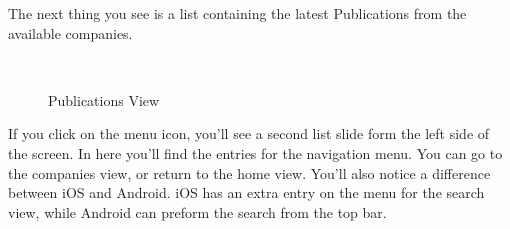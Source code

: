 The next thing you see is a list containing the latest Publications from the available companies.

\begin{figure}[H]
        \myfloatalign
         \quad
         \\
        \caption[Publications View]{Publications View}
\end{figure}

If you click on the menu icon, you'll see a second list slide form the left side of the screen. In here you'll find the entries for the navigation menu. You can go to the companies view, or return to the home view. You'll also notice a difference between iOS and Android. iOS has an extra entry on the menu for the search view, while Android can preform the search from the top bar.

